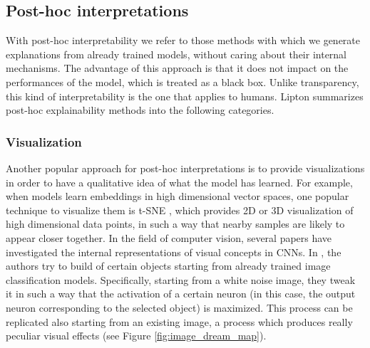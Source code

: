 \subsection{Post-hoc interpretations}
\label{subsec:posthoc}

With post-hoc interpretability we refer to those methods with which we generate explanations from already trained models, without caring about their internal mechanisms. The advantage of this approach is that it does not impact on the performances of the model, which is treated as a black box. Unlike transparency, this kind of interpretability is the one that applies to humans.
Lipton \cite{lipton2017mythos} summarizes post-hoc explainability  methods into 
the following categories.

%



\subsubsection{Visualization}
Another popular approach for post-hoc interpretations is to provide visualizations in order to have a qualitative idea of what the model has learned. For example, when models learn embeddings in high dimensional vector spaces, one popular technique to visualize them is t-SNE \cite{laurens2008tsne}, which provides 2D or 3D visualization of high dimensional data points, in such a way that nearby samples are likely to appear closer together. In the field of computer vision, several papers have investigated the internal representations of visual concepts in CNNs. In \cite{mordvintsev2015inceptionism}, the authors try to build  of certain objects starting from already trained image classification models. Specifically, starting from a white noise image, they tweak it in such a way that the activation of a certain neuron (in this case, the output neuron corresponding to the selected object) is maximized. This process can be replicated also starting from an existing image, a process which produces really peculiar visual effects (see Figure \ref{fig:image_dream_map}). 

